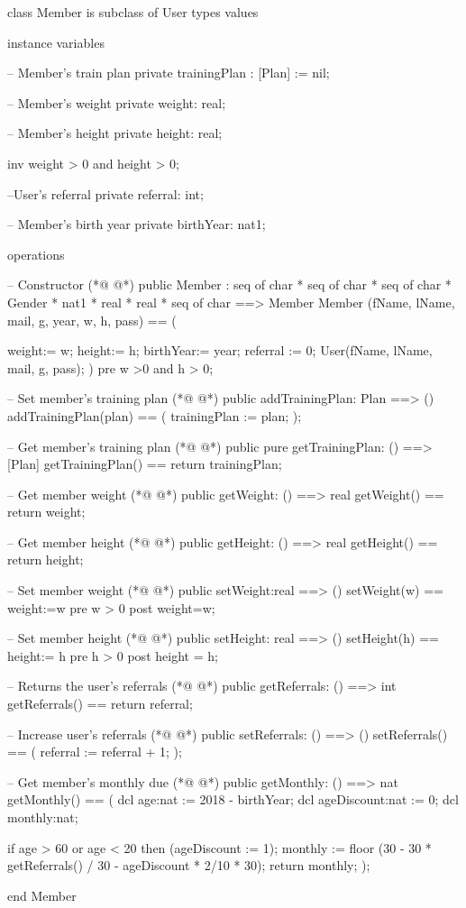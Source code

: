 \begin{vdmpp}[breaklines=true]
class Member is subclass of User
types
values

instance variables
 
 -- Member's train plan
 private trainingPlan : [Plan] := nil;
 
 -- Member's weight
 private weight: real;
 
 -- Member's height
 private height: real;
 
 inv weight > 0 and height > 0;
 
 --User's referral
 private referral: int;

 -- Member's birth year
 private birthYear: nat1;
 
 
operations

 -- Constructor
(*@
\label{Member:28}
@*)
 public Member : seq of char * seq of char * seq of char * Gender * nat1 * real * real * seq of char ==> Member
 Member (fName, lName, mail, g, year, w, h, pass) == (
   
  weight:= w;
  height:= h;
  birthYear:= year;
  referral := 0;
  User(fName, lName, mail, g, pass);
 )
 pre w >0 and h > 0;

 -- Set member's training plan
(*@
\label{addTrainingPlan:40}
@*)
 public addTrainingPlan: Plan ==> ()
 addTrainingPlan(plan) == (
  trainingPlan := plan;
 );
 
 -- Get member's training plan
(*@
\label{getTrainingPlan:46}
@*)
 public pure getTrainingPlan: () ==> [Plan]
 getTrainingPlan() == return trainingPlan;
 
 -- Get member weight
(*@
\label{getWeight:50}
@*)
 public getWeight: () ==> real
 getWeight() == return weight;
 
 -- Get member height
(*@
\label{getHeight:54}
@*)
 public getHeight: () ==> real
 getHeight() == return height;  
 
 -- Set member weight
(*@
\label{setWeight:58}
@*)
 public setWeight:real ==> ()
 setWeight(w) ==  weight:=w
  pre w > 0
  post weight=w;
 
 -- Set member height
(*@
\label{setHeight:64}
@*)
 public setHeight: real ==> ()
 setHeight(h) == height:= h
  pre h > 0
  post height = h; 
 
 -- Returns the user's referrals
(*@
\label{getReferrals:70}
@*)
 public getReferrals: () ==> int
 getReferrals() ==
  return referral;
 
 -- Increase user's referrals
(*@
\label{setReferrals:75}
@*)
 public setReferrals: () ==> ()
 setReferrals() == (
  referral := referral + 1;
 );
 
 -- Get member's monthly due
(*@
\label{getMonthly:81}
@*)
 public getMonthly: () ==> nat
 getMonthly() == (
  dcl age:nat := 2018 - birthYear;
  dcl ageDiscount:nat := 0;
  dcl monthly:nat;
  
  if age > 60 or age < 20
   then (ageDiscount := 1);
  monthly := floor (30 - 30 * getReferrals() / 30 - ageDiscount * 2/10 * 30);
  return monthly;
 );
 
end Member
\end{vdmpp}
